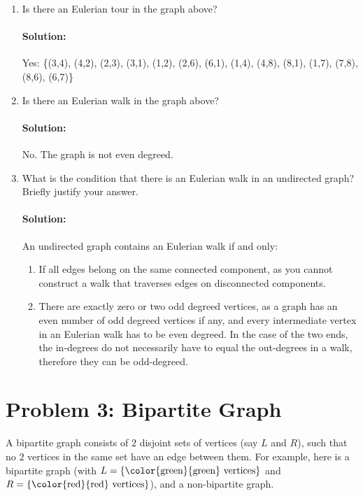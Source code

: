 \documentclass[11pt, notitlepage]{report}
\newcommand{\Question}[1]{\newpage\section{#1}}
\newenvironment{solution}{\paragraph{Solution:}}{\hfill}
\begin{document}
\begin{enumerate}[label=(\alph*)]
    \item Is there an Eulerian tour in the graph above?

	\begin{solution}
		Yes: \{(3,4), (4,2), (2,3), (3,1), (1,2), (2,6), (6,1), (1,4), (4,8), (8,1), (1,7), (7,8), (8,6), (6,7)\}
		
	\end{solution}

    \item Is there an Eulerian walk in the graph above?

	\begin{solution}
		No. The graph is not even degreed.
		
	\end{solution}

    \item What is the condition that there is an Eulerian walk in an undirected graph? Briefly justify your answer.
    \begin{solution}
    	An undirected graph contains an Eulerian walk if and only:    	
    	\begin{enumerate}[label=\roman*.)]
    	\item If all edges belong on the same connected component, as you cannot construct a walk that traverses edges on disconnected components.
    	\item There are exactly zero or two odd degreed vertices, as a graph has an even number of odd degreed vertices if any, and every intermediate vertex in an Eulerian walk has to be even degreed. In the case of the two ends, the in-degrees do not necessarily have to equal the out-degrees in a walk, therefore they can be odd-degreed.
    	\end{enumerate}
    \end{solution}
\end{enumerate}



\Question{Problem 3: Bipartite Graph}
A bipartite graph consists of $2$ disjoint sets of vertices (say $L$ and $R$), such that no $2$ vertices in the same set have an edge between them. 
For example, here is a bipartite graph (with $L=\{\hbox{{\color{green}{green}} vertices}\}$ and $R =\{\hbox{{\color{red}{red}} vertices}\}$),  and a non-bipartite graph.
\end{document}
